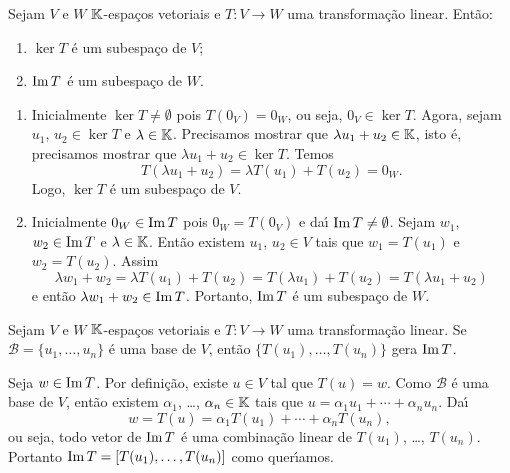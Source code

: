 \begin{proposicao}
  Sejam $V$ e $W$ $\mathbb{K}$-espa\c{c}os vetoriais e $T : V \to W$ uma transforma\c{c}\~ao linear. Ent\~ao:
  \begin{enumerate}[label={\roman*})]
    \item $\ker T$ \'e um subespa\c{c}o de $V$;
    \item ${\rm Im\,} T$ \'e um subespa\c{c}o de $W$.
  \end{enumerate}
\end{proposicao}
\begin{prova}
  \begin{enumerate}[label={\roman*})]
    \item Inicialmente $\ker T \ne \emptyset$ pois $T(0_V) = 0_W$, ou seja, $0_V \in \ker T$. Agora, sejam $u_1$, $u_2 \in \ker T$ e $\lambda \in \mathbb{K}$. Precisamos mostrar que $\lambda u_1 + u_2 \in \mathbb{K}$, isto \'e, precisamos mostrar que $\lambda u_1 + u_2 \in \ker T$. Temos
    \[
      T(\lambda u_1 + u_2) = \lambda T(u_1) + T(u_2) = 0_W.
    \]
    Logo, $\ker T$ \'e um subespa\c{c}o de $V$.

    \item Inicialmente $0_W \in {\rm Im\,} T$ pois $0_W = T(0_V)$ e da{\'\i} ${\rm Im\,} T \ne \emptyset$. Sejam $w_1$, $w_2 \in {\rm Im\,} T$ e $\lambda \in \mathbb{K}$. Ent\~ao existem $u_1$, $u_2 \in V$ tais que $w_1 = T(u_1)$ e $w_2 = T(u_2)$. Assim
    \[
      \lambda w_1 + w_2 = \lambda T(u_1) + T(u_2) = T(\lambda u_1) + T(u_2) = T(\lambda u_1 + u_2)
    \]
    e ent\~ao $\lambda w_1 + w_2 \in {\rm Im\,} T$. Portanto, ${\rm Im\,} T$ \'e um subespa\c{c}o de $W$.
  \end{enumerate}
\end{prova}

\begin{lema}\label{transformacao_gera_imagem}
  Sejam $V$ e $W$ $\mathbb{K}$-espa\c{c}os vetoriais e $T : V \to W$ uma transforma\c{c}\~ao linear. Se $\mathcal{B} = \{u_1, \dots, u_n\}$ \'e uma base de $V$, ent\~ao $\{T(u_1), \dots, T(u_n)\}$ gera ${\rm Im\,} T$.
\end{lema}
\begin{prova}
  Seja $w \in {\rm Im\,} T$. Por defini\c{c}\~ao, existe $u \in V$ tal que $T(u) = w$. Como $\mathcal{B}$ \'e uma base de $V$, ent\~ao existem $\alpha_1$, \dots, $\alpha_n \in \mathbb{K}$ tais que $u = \alpha_1u_1 + \cdots + \alpha_nu_n$. Da{\'\i}
  \[
    w = T(u) = \alpha_1T(u_1) + \cdots + \alpha_nT(u_n),
  \]
  ou seja, todo vetor de ${\rm Im\,} T$ \'e uma combina\c{c}\~ao linear de $T(u_1)$, \dots, $T(u_n)$. Portanto ${\rm Im\,} T = [T(u_1), \dots, T(u_n)]$ como quer{\'\i}amos.
\end{prova}

